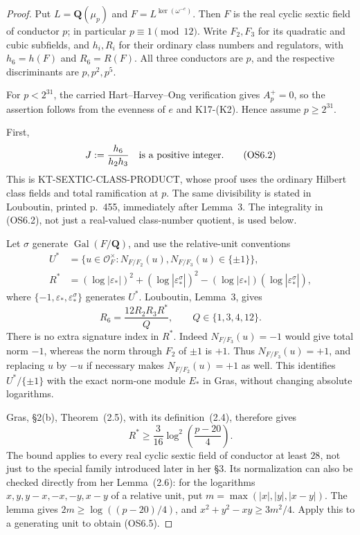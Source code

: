 \documentclass[11pt,a4paper]{article}
\theoremstyle{definition}
\begin{document}
\begin{proof}
Put $L=\mathbf Q(\mu_p)$ and
$F=L^{\ker(\omega^{-e})}$.  Then $F$ is the real cyclic
sextic field of conductor $p$; in particular $p\equiv1\pmod{12}$.
Write $F_2,F_3$ for its quadratic and cubic subfields,
and $h_i,R_i$ for their ordinary class numbers and regulators,
with $h_6=h(F)$ and $R_6=R(F)$.  All three conductors are $p$,
and the respective discriminants are $p,p^2,p^5$.

For $p<2^{31}$, the carried Hart--Harvey--Ong verification
gives $A_p^+=0$, so the assertion follows from the evenness
of $e$ and K17-(K2).  Hence assume $p\ge2^{31}$.

First,
\[
                         J:=\frac{h_6}{h_2h_3}
                            \quad\hbox{is a positive integer}. \tag{OS6.2}
\]
This is KT-SEXTIC-CLASS-PRODUCT, whose proof uses the ordinary
Hilbert class fields and total ramification at $p$.
The same divisibility is stated in Louboutin, printed p.~455,
immediately after Lemma~3.  The integrality in (OS6.2),
not just a real-valued class-number quotient, is used below.

Let $\sigma$ generate $\operatorname{Gal}(F/\mathbf Q)$,
and use the relative-unit conventions
\[
\begin{split}
 U^*&=\{u\in\mathcal O_F^\times:
       N_{F/F_2}(u),N_{F/F_3}(u)\in\{\pm1\}\},\\
 R^*&=(\log|\varepsilon_*|)^2+
       (\log|\varepsilon_*^\sigma|)^2
       -(\log|\varepsilon_*|)(\log|\varepsilon_*^\sigma|),
\end{split}                                                   \tag{OS6.3}
\]
where $\{-1,\varepsilon_*,\varepsilon_*^\sigma\}$ generates
$U^*$.  Louboutin, Lemma~3, gives
\[
                 R_6=\frac{12R_2R_3R^*}{Q},
                 \qquad Q\in\{1,3,4,12\}.             \tag{OS6.4}
\]
There is no extra signature index in $R^*$.
Indeed $N_{F/F_3}(u)=-1$ would give total norm $-1$,
whereas the norm through $F_2$ of $\pm1$ is $+1$.
Thus $N_{F/F_3}(u)=+1$, and replacing $u$ by $-u$
if necessary makes $N_{F/F_2}(u)=+1$ as well.
This identifies $U^*/\{\pm1\}$ with the exact norm-one
module $E_*$ in Gras, without changing absolute logarithms.

Gras, \S2(b), Theorem~(2.5), with its definition~(2.4),
therefore gives
\[
                    R^*\ge\frac3{16}
                    \log^2\!\left(\frac{p-20}{4}\right).
                                                               \tag{OS6.5}
\]
The bound applies to every real cyclic sextic field of
conductor at least $28$, not just to the special family
introduced later in her \S3.  Its normalization can also
be checked directly from her Lemma~(2.6): for the logarithms
$x,y,y-x,-x,-y,x-y$ of a relative unit, put
$m=\max(|x|,|y|,|x-y|)$.  The lemma gives
$2m\ge\log((p-20)/4)$, and
$x^2+y^2-xy\ge3m^2/4$.  Apply this to a generating unit
to obtain (OS6.5).


\end{proof}
\end{document}
